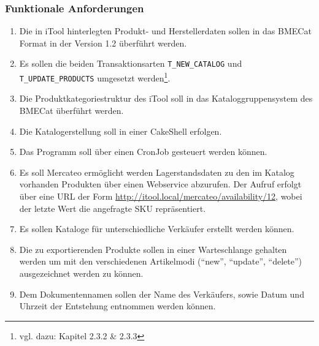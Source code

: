 		\subsubsection{Funktionale Anforderungen}
		\begin{enumerate}[noitemsep]
		\item Die in iTool hinterlegten Produkt- und Herstellerdaten sollen in das BMECat Format in der Version 1.2 überführt werden. 
		\item Es sollen die beiden Transaktionsarten \texttt{T\_NEW\_CATALOG} und \texttt{T\_UPDATE\_PRODUCTS} umgesetzt werden\footnote{vgl. dazu: Kapitel 2.3.2 \& 2.3.3}.
		\item Die Produktkategoriestruktur des iTool soll in das Kataloggruppensystem des BMECat überführt werden.
		\item Die Katalogerstellung soll in einer CakeShell erfolgen.
		\item Das Programm soll über einen CronJob gesteuert werden können.
		\item Es soll Mercateo ermöglicht werden Lagerstandsdaten zu den im Katalog vorhanden Produkten über einen Webservice abzurufen. Der Aufruf erfolgt über eine URL der Form \url{http://itool.local/mercateo/availability/12}, wobei der letzte Wert die angefragte SKU repräsentiert. 
		\item Es sollen Kataloge für unterschiedliche Verkäufer erstellt werden können.
		\item Die zu exportierenden Produkte sollen in einer Warteschlange gehalten werden um mit den verschiedenen Artikelmodi (\enquote{new}, \enquote{update}, \enquote{delete}) ausgezeichnet werden zu können.
		\item Dem Dokumentennamen sollen der Name des Verkäufers, sowie Datum und Uhrzeit der Entstehung entnommen werden können.
		
		\end{enumerate}
